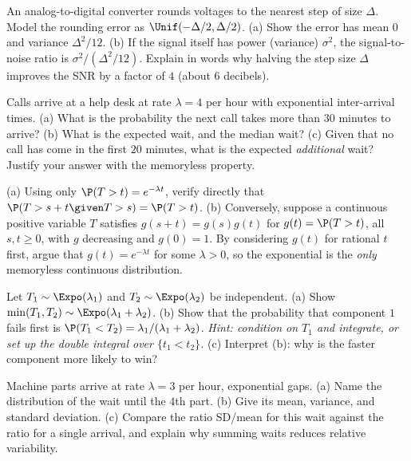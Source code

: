 \begin{exercise}
\label{ch11:exr-quant}
An analog-to-digital converter rounds voltages to the nearest step of size
$\Delta$. Model the rounding error as $\Unif(-\Delta/2,\Delta/2)$. (a) Show the
error has mean $0$ and variance $\Delta^2/12$. (b) If the signal itself has power
(variance) $\sigma^2$, the signal-to-noise ratio is $\sigma^2/(\Delta^2/12)$.
Explain in words why halving the step size $\Delta$ improves the SNR by a factor
of $4$ (about $6$ decibels).
\end{exercise}

\begin{exercise}
\label{ch11:exr-expo}
Calls arrive at a help desk at rate $\lambda = 4$ per hour with exponential
inter-arrival times. (a) What is the probability the next call takes more than
$30$ minutes to arrive? (b) What is the expected wait, and the median wait?
(c) Given that no call has come in the first $20$ minutes, what is the expected
\emph{additional} wait? Justify your answer with the memoryless property.
\end{exercise}

\begin{exercise}
\label{ch11:exr-memoryless}
(a) Using only $\P(T>t)=e^{-\lambda t}$, verify directly that
$\P(T > s+t \given T > s) = \P(T>t)$. (b) Conversely, suppose a continuous
positive variable $T$ satisfies $g(s+t)=g(s)g(t)$ for $g(t)=\P(T>t)$, all
$s,t\ge0$, with $g$ decreasing and $g(0)=1$. By considering $g(t)$ for rational
$t$ first, argue that $g(t)=e^{-\lambda t}$ for some $\lambda>0$, so the
exponential is the \emph{only} memoryless continuous distribution.
\end{exercise}

\begin{exercise}
\label{ch11:exr-min}
Let $T_1\sim\Expo(\lambda_1)$ and $T_2\sim\Expo(\lambda_2)$ be independent.
(a) Show $\min(T_1,T_2)\sim\Expo(\lambda_1+\lambda_2)$. (b) Show that the
probability that component $1$ fails first is
$\P(T_1 < T_2) = \lambda_1/(\lambda_1+\lambda_2)$. \emph{Hint: condition on
$T_1$ and integrate, or set up the double integral over $\{t_1<t_2\}$.}
(c) Interpret (b): why is the faster component more likely to win?
\end{exercise}

\begin{exercise}
\label{ch11:exr-gamma}
Machine parts arrive at rate $\lambda=3$ per hour, exponential gaps. (a) Name
the distribution of the wait until the $4$th part. (b) Give its mean, variance,
and standard deviation. (c) Compare the ratio SD/mean for this wait against the
ratio for a single arrival, and explain why summing waits reduces relative
variability.
\end{exercise}

